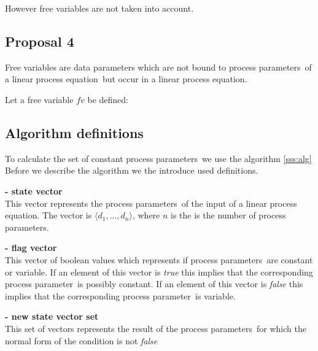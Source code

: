 \documentclass[a4paper,10pt]{article}
\newcommand{\lpe}{linear process equation}
\newcommand{\pp}{process parameter}
\newcommand{\pps}{process parameters}
\newcommand{\ti}{\textit}
\begin{document}
\begin{defn}
However free variables are not taken into account.
\end{defn}

\subsection{Proposal 4}
Free variables are data parameters which are not bound to \pps\ of a \lpe\ but occur in a \lpe .
\begin{defn} Let a free variable $fv$ be defined:
\begin{displaymath}
\end{displaymath}
\end{defn}



\subsection{Algorithm definitions}
To calculate the set of constant \pps\ we use the algorithm
\ref{sss:alg} Before we describe the algorithm we the introduce
used definitions. 

\begin{defn} \textbf{- state vector} \label{sv}\\
This vector represents the \pps\ of the input of a \lpe . The vector is 
$\langle d_1, \ldots, d_n \rangle$, where $n$ is the is the number
of \pps . 
\end{defn}

\begin{defn} \textbf{- flag vector}\\
This vector of boolean values which represents if \pps\
are constant or variable. If an element of this vector is \ti{true}
this implies that the corresponding \pp\ is possibly constant. If an element
of this vector is \ti{false} this implies that the corresponding
\pp\ is variable.
\end{defn}

\begin{defn} \textbf{- new state vector set}\\
 This set of vectors represents the result of the
\pps\ for which the normal form of the condition is not \ti{false}
\end{defn} 
\end{document}
